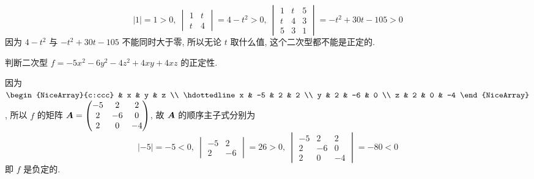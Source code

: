 \begin{solution}
\begin{enumerate}[label=(\arabic{*})]
              $$|1|=1>0,~\begin{vmatrix}
                      1 & t \\
                      t & 4
                  \end{vmatrix}=4-t^2>0,~\begin{vmatrix}
                      1 & t & 5 \\
                      t & 4 & 3 \\
                      5 & 3 & 1
                  \end{vmatrix}=-t^2+30t-105>0$$
              因为 $4-t^2$ 与 $-t^2+30t-105$ 不能同时大于零, 所以无论 $t$ 取什么值, 这个二次型都不能是正定的.
    \end{enumerate}
\end{solution}

\begin{example}
    判断二次型 $f=-5x^2-6y^2-4z^2+4xy+4xz$ 的正定性.
\end{example}
\begin{solution}
    因为 $\begin{NiceArray}{c:ccc}
              & x  & y  & z  \\ \hdottedline
            x & -5 & 2  & 2  \\
            y & 2  & -6 & 0  \\
            z & 2  & 0  & -4
        \end{NiceArray}$, 所以 $f$ 的矩阵 $\vb*{A}=\begin{pmatrix}
            -5 & 2  & 2  \\
            2  & -6 & 0  \\
            2  & 0  & -4
        \end{pmatrix}$, 故 $\vb*{A}$ 的顺序主子式分别为
    $$|-5|=-5<0,~\begin{vmatrix}
            -5 & 2  \\
            2  & -6
        \end{vmatrix}=26>0,~\begin{vmatrix}
            -5 & 2  & 2  \\
            2  & -6 & 0  \\
            2  & 0  & -4
        \end{vmatrix}=-80<0$$
    即 $f$ 是负定的.
\end{solution}

